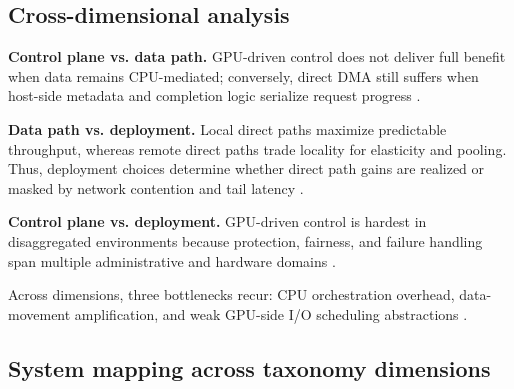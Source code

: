 \subsection{Cross-dimensional analysis}

\textbf{Control plane vs. data path.} GPU-driven control does not deliver full benefit when data remains CPU-mediated; conversely, direct DMA still suffers when host-side metadata and completion logic serialize request progress \cite{silberstein2013gpufs,nvidia_gds_best_practices,qureshi2023bam}.

\textbf{Data path vs. deployment.} Local direct paths maximize predictable throughput, whereas remote direct paths trade locality for elasticity and pooling. Thus, deployment choices determine whether direct path gains are realized or masked by network contention and tail latency \cite{nvmeof_spec,liu2017rackscale,nvidia_gdrdma}.

\textbf{Control plane vs. deployment.} GPU-driven control is hardest in disaggregated environments because protection, fairness, and failure handling span multiple administrative and hardware domains \cite{zhang2025hpcstoragesurvey,liu2017rackscale,geminifs2025}.

Across dimensions, three bottlenecks recur: CPU orchestration overhead, data-movement amplification, and weak GPU-side I/O scheduling abstractions \cite{murray2021tfdata,nvidia_gds_overview,qureshi2023bam}.

\subsection{System mapping across taxonomy dimensions}

